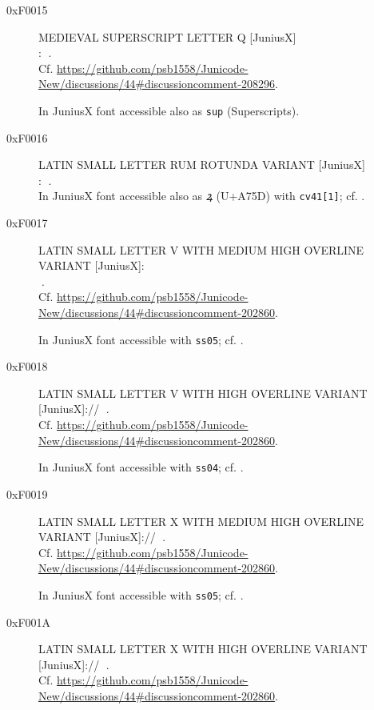 \documentclass{article}
\newcommand{\Jglyph}[1]{{\relsize{2}\J#1}}
\begin{document}
\begin{description}
\item [0xF0015] MEDIEVAL SUPERSCRIPT LETTER Q [JuniusX]\\:
  \Jglyph{󰀕}.\\
  Cf. \url{https://github.com/psb1558/Junicode-New/discussions/44#discussioncomment-208296}.

  In JuniusX font accessible also as \texttt{sup} (Superscripts).


\item [0xF0016] LATIN SMALL LETTER RUM ROTUNDA VARIANT [JuniusX]\\:
  \Jglyph{󰀖}.\\%

  In JuniusX font accessible also as \textit{ꝝ} (U+A75D) with \texttt{cv41[1]};
  cf. \autocite[p. 12]{baker20:_opent_featur_junius_junius}.
\item [0xF0017] LATIN SMALL LETTER V WITH MEDIUM HIGH OVERLINE VARIANT [JuniusX]:\\
  \Jglyph{󰀗}.\\ Cf. \url{https://github.com/psb1558/Junicode-New/discussions/44#discussioncomment-202860}.

      In JuniusX font accessible  with \texttt{ss05};
  cf. \autocite[p. 7]{baker20:_opent_featur_junius_junius}.

  
\item [0xF0018] LATIN SMALL LETTER V WITH HIGH OVERLINE VARIANT [JuniusX]:// 
  \Jglyph{󰀘}.\\ Cf. \url{https://github.com/psb1558/Junicode-New/discussions/44#discussioncomment-202860}.

  In JuniusX font accessible  with \texttt{ss04};
  cf. \autocite[p. 6]{baker20:_opent_featur_junius_junius}.


\item [0xF0019] LATIN SMALL LETTER X WITH MEDIUM HIGH OVERLINE VARIANT [JuniusX]:// 
  \Jglyph{󰀙}.\\ Cf. \url{https://github.com/psb1558/Junicode-New/discussions/44#discussioncomment-202860}.

  
      In JuniusX font accessible  with \texttt{ss05};
  cf. \autocite[p. 7]{baker20:_opent_featur_junius_junius}.

\item [0xF001A] LATIN SMALL LETTER X WITH HIGH OVERLINE VARIANT [JuniusX]:// 
  \Jglyph{󰀚}.\\ Cf. \url{https://github.com/psb1558/Junicode-New/discussions/44#discussioncomment-202860}.


\end{description}
\end{document}
